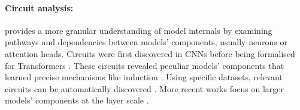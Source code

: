 \paragraph{Circuit analysis:} provides a more granular understanding of model internals by examining pathways and dependencies between models' components, usually neurons or attention heads. Circuits were first discovered in CNNs \cite{Olah2020ZoomIA} before being formalised for Transformers \cite{elhage2021mathematical}.  These circuits revealed peculiar models' components that learned precise mechanisms like induction \cite{Olsson2022IncontextLA}. Using specific datasets, relevant circuits can be automatically discovered \cite{conmy2023automated}. More recent works focus on larger models' components at the layer scale \cite{Dunefsky2024TranscodersFI}.






